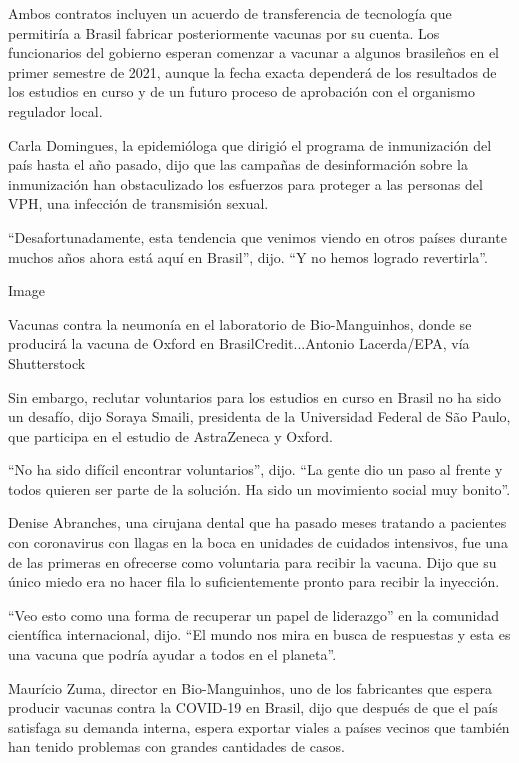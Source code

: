 Ambos contratos incluyen un acuerdo de transferencia de tecnología que
permitiría a Brasil fabricar posteriormente vacunas por su cuenta. Los
funcionarios del gobierno esperan comenzar a vacunar a algunos
brasileños en el primer semestre de 2021, aunque la fecha exacta
dependerá de los resultados de los estudios en curso y de un futuro
proceso de aprobación con el organismo regulador local.

Carla Domingues, la epidemióloga que dirigió el programa de inmunización
del país hasta el año pasado, dijo que las campañas de desinformación
sobre la inmunización han obstaculizado los esfuerzos para proteger a
las personas del VPH, una infección de transmisión sexual.

``Desafortunadamente, esta tendencia que venimos viendo en otros países
durante muchos años ahora está aquí en Brasil'', dijo. ``Y no hemos
logrado revertirla''.

Image

Vacunas contra la neumonía en el laboratorio de Bio-Manguinhos, donde se
producirá la vacuna de Oxford en BrasilCredit...Antonio Lacerda/EPA, vía
Shutterstock

Sin embargo, reclutar voluntarios para los estudios en curso en Brasil
no ha sido un desafío, dijo Soraya Smaili, presidenta de la Universidad
Federal de São Paulo, que participa en el estudio de AstraZeneca y
Oxford.

``No ha sido difícil encontrar voluntarios'', dijo. ``La gente dio un
paso al frente y todos quieren ser parte de la solución. Ha sido un
movimiento social muy bonito''.

Denise Abranches, una cirujana dental que ha pasado meses tratando a
pacientes con coronavirus con llagas en la boca en unidades de cuidados
intensivos, fue una de las primeras en ofrecerse como voluntaria para
recibir la vacuna. Dijo que su único miedo era no hacer fila lo
suficientemente pronto para recibir la inyección.

``Veo esto como una forma de recuperar un papel de liderazgo'' en la
comunidad científica internacional, dijo. ``El mundo nos mira en busca
de respuestas y esta es una vacuna que podría ayudar a todos en el
planeta''.

Maurício Zuma, director en Bio-Manguinhos, uno de los fabricantes que
espera producir vacunas contra la COVID-19 en Brasil, dijo que después
de que el país satisfaga su demanda interna, espera exportar viales a
países vecinos que también han tenido problemas con grandes cantidades
de casos.

